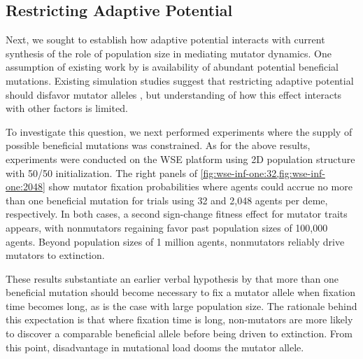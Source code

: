 \subsection{Restricting Adaptive Potential}
\label{sec:restricting-adaptive-potential}

Next, we sought to establish how adaptive potential interacts with current synthesis of the role of population size in mediating mutator dynamics.
One assumption of existing work by \citet{raynes2018sign} is availability of abundant potential beneficial mutations.
Existing simulation studies suggest that restricting adaptive potential should disfavor mutator alleles \citep{tenaillon1999mutators}, but understanding of how this effect interacts with other factors is limited.

To investigate this question, we next performed experiments where the supply of possible beneficial mutations was constrained.
As for the above results, experiments were conducted on the WSE platform using 2D population structure with 50/50 initialization.
The right panels of \cref{fig:wse-inf-one:32,fig:wse-inf-one:2048} show mutator fixation probabilities where agents could accrue no more than one beneficial mutation for trials using 32 and 2,048 agents per deme, respectively.
In both cases, a second sign-change fitness effect for mutator traits appears, with nonmutators regaining favor past population sizes of 100,000 agents.
Beyond population sizes of 1 million agents, nonmutators reliably drive mutators to extinction.

These results substantiate an earlier verbal hypothesis by \citet{desai2011balance} that more than one beneficial mutation should become necessary to fix a mutator allele when fixation time becomes long, as is the case with large population size.
The rationale behind this expectation is that where fixation time is long, non-mutators are more likely to discover a comparable beneficial allele before being driven to extinction.
From this point, disadvantage in mutational load dooms the mutator allele.



